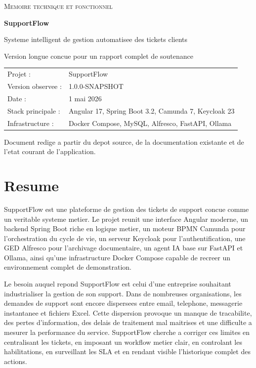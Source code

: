 \documentclass[12pt,a4paper,oneside]{report}
\begin{document}
\begin{titlepage}
  \centering
  {\scshape\Large Memoire technique et fonctionnel \par}
  \vspace{1.8cm}
  {\Huge\bfseries SupportFlow \par}
  \vspace{0.5cm}
  {\Large Systeme intelligent de gestion automatisee des tickets clients \par}
  \vspace{2cm}
  {\large Version longue concue pour un rapport complet de soutenance \par}
  \vspace{1.6cm}
  \begin{tabular}{ll}
    Projet : & SupportFlow \\
    Version observee : & 1.0.0-SNAPSHOT \\
    Date : & 1 mai 2026 \\
    Stack principale : & Angular 17, Spring Boot 3.2, Camunda 7, Keycloak 23 \\
    Infrastructure : & Docker Compose, MySQL, Alfresco, FastAPI, Ollama \\
  \end{tabular}
  \vfill
  {\large Document redige a partir du depot source, de la documentation existante et de l'etat courant de l'application. \par}
\end{titlepage}


\chapter*{Resume}

SupportFlow est une plateforme de gestion des tickets de support concue comme un veritable systeme metier. Le projet reunit une interface Angular moderne, un backend Spring Boot riche en logique metier, un moteur BPMN Camunda pour l'orchestration du cycle de vie, un serveur Keycloak pour l'authentification, une GED Alfresco pour l'archivage documentaire, un agent IA base sur FastAPI et Ollama, ainsi qu'une infrastructure Docker Compose capable de recreer un environnement complet de demonstration.

Le besoin auquel repond SupportFlow est celui d'une entreprise souhaitant industrialiser la gestion de son support. Dans de nombreuses organisations, les demandes de support sont encore dispersees entre email, telephone, messagerie instantanee et fichiers Excel. Cette dispersion provoque un manque de tracabilite, des pertes d'information, des delais de traitement mal maitrises et une difficulte a mesurer la performance du service. SupportFlow cherche a corriger ces limites en centralisant les tickets, en imposant un workflow metier clair, en controlant les habilitations, en surveillant les SLA et en rendant visible l'historique complet des actions.
\end{document}
